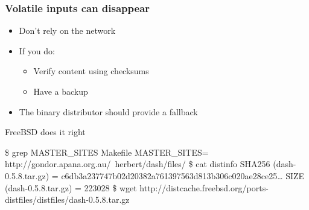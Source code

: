 \documentclass[14pt,aspectratio=169]{beamer}
\begin{document}
\begin{frame}[fragile]
 \frametitle{Volatile inputs can disappear}

 \begin{itemize}
  \item Don't rely on the network
  \item If you do:
   \begin{itemize}
    \item Verify content using checksums
    \item Have a backup
   \end{itemize}
  \item The binary distributor should provide a fallback
\end{itemize}

\begin{block}{\small FreeBSD does it right}\footnotesize
\begin{semiverbatim}
\$ grep MASTER\_SITES Makefile
MASTER\_SITES= http://gondor.apana.org.au/~herbert/dash/files/
\$ cat distinfo
SHA256 (dash-0.5.8.tar.gz) = c6db3a237747b02d20382a761397563d813b306c020ae28ce25…
SIZE (dash-0.5.8.tar.gz) = 223028
\$ wget http://distcache.freebsd.org/ports-distfiles/distfiles/dash-0.5.8.tar.gz
\end{semiverbatim}
\end{block}
\end{frame}

\begin{frame}[plain]
\end{frame}
\end{document}
